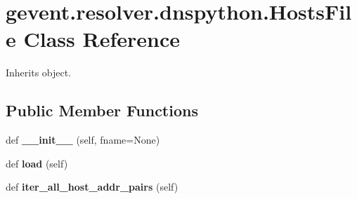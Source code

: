 \hypertarget{classgevent_1_1resolver_1_1dnspython_1_1_hosts_file}{}\section{gevent.\+resolver.\+dnspython.\+Hosts\+File Class Reference}
\label{classgevent_1_1resolver_1_1dnspython_1_1_hosts_file}


Inherits object.

\subsection*{Public Member Functions}
\begin{DoxyCompactItemize}
\item 
\mbox{\label{classgevent_1_1resolver_1_1dnspython_1_1_hosts_file_a923def99f431453d13e362b478ec5020}} 
def {\bfseries \+\_\+\+\_\+init\+\_\+\+\_\+} (self, fname=None)
\item 
\mbox{\label{classgevent_1_1resolver_1_1dnspython_1_1_hosts_file_ad7b99481cbe6397d4db0272187e06bde}} 
def {\bfseries load} (self)
\item 
\mbox{\label{classgevent_1_1resolver_1_1dnspython_1_1_hosts_file_a811ae8e12baca4447b1b694ae8abb59e}} 
def {\bfseries iter\+\_\+all\+\_\+host\+\_\+addr\+\_\+pairs} (self)
\end{DoxyCompactItemize}
